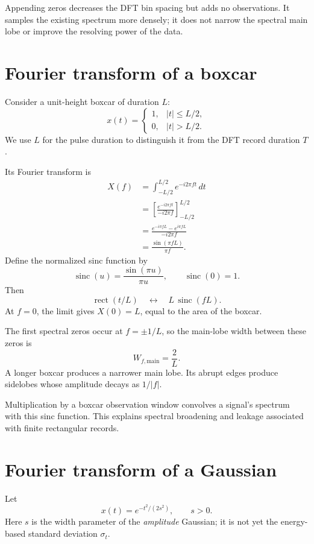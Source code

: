 \documentclass[11pt,letterpaper]{article}
\newcommand{\sinc}{\operatorname{sinc}}
\begin{document}
Appending zeros decreases the DFT bin spacing but adds no observations.
It samples the existing spectrum more densely; it does not narrow
the spectral main lobe or improve the resolving power of the data.

\section{Fourier transform of a boxcar}

Consider a unit-height boxcar of duration $L$:
\[
x(t)=
\begin{cases}
1,& |t|\leq L/2,\\
0,& |t|>L/2.
\end{cases}
\]
We use $L$ for the pulse duration to distinguish it from the DFT
record duration $T$.

Its Fourier transform is
\begin{align}
X(f)
&=\int_{-L/2}^{L/2}e^{-i2\pi ft}\,dt\\
&=\left[\frac{e^{-i2\pi ft}}{-i2\pi f}\right]_{-L/2}^{L/2}\\
&=\frac{e^{-i\pi fL}-e^{i\pi fL}}{-i2\pi f}\\
&=\frac{\sin(\pi fL)}{\pi f}.
\end{align}
Define the normalized sinc function by
\[
\sinc(u)=\frac{\sin(\pi u)}{\pi u},\qquad \sinc(0)=1.
\]
Then
\begin{equation}
\boxed{
\operatorname{rect}(t/L)
\quad\longleftrightarrow\quad
L\,\sinc(fL).
}
\end{equation}
At $f=0$, the limit gives $X(0)=L$, equal to the area of the boxcar.

The first spectral zeros occur at $f=\pm1/L$, so the main-lobe
width between these zeros is
\begin{equation}
\boxed{W_{f,\mathrm{main}}=\frac{2}{L}.}
\end{equation}
A longer boxcar produces a narrower main lobe. Its abrupt edges
produce sidelobes whose amplitude decays as $1/|f|$.

Multiplication by a boxcar observation window convolves a signal's
spectrum with this sinc function. This explains spectral broadening
and leakage associated with finite rectangular records.

\section{Fourier transform of a Gaussian}

Let
\[
x(t)=e^{-t^2/(2s^2)},\qquad s>0.
\]
Here $s$ is the width parameter of the \emph{amplitude} Gaussian;
it is not yet the energy-based standard deviation $\sigma_t$.
\end{document}
